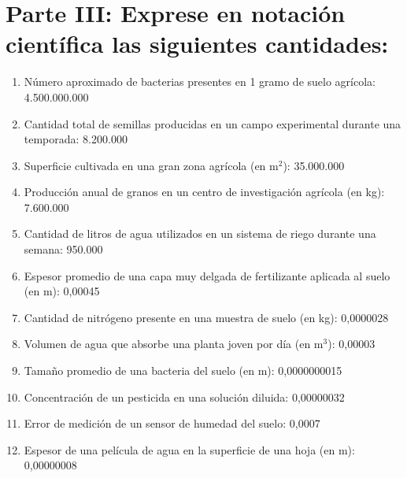 \documentclass[12pt]{article}
\begin{document}
\section*{Parte III: Exprese en notación científica las siguientes cantidades:}

\begin{enumerate}
	
	\item Número aproximado de bacterias presentes en 1 gramo de suelo agrícola: 4.500.000.000
	
	\item Cantidad total de semillas producidas en un campo experimental durante una temporada: 8.200.000
	
	\item Superficie cultivada en una gran zona agrícola (en m$^2$): 35.000.000
	
	\item Producción anual de granos en un centro de investigación agrícola (en kg): 7.600.000
	
	\item Cantidad de litros de agua utilizados en un sistema de riego durante una semana: 950.000
	
	\item Espesor promedio de una capa muy delgada de fertilizante aplicada al suelo (en m): 0,00045
	
	\item Cantidad de nitrógeno presente en una muestra de suelo (en kg): 0,0000028
	
	\item Volumen de agua que absorbe una planta joven por día (en m$^3$): 0,00003
	
	\item Tamaño promedio de una bacteria del suelo (en m): 0,0000000015
	
	\item Concentración de un pesticida en una solución diluida: 0,00000032
	
	\item Error de medición de un sensor de humedad del suelo: 0,0007
	
	\item Espesor de una película de agua en la superficie de una hoja (en m): 0,00000008
	
\end{enumerate}

\newpage

\vspace*{2em}
\end{document}
